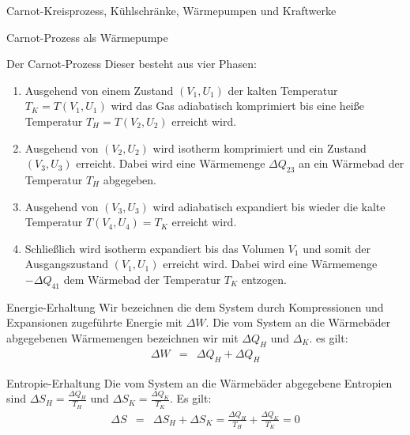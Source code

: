 \begin{chapter}{\titlestr}
\begin{section}{Carnot-Kreisprozess, Kühlschränke, Wärmepumpen und Kraftwerke}
\begin{subsection}{Carnot-Prozess als Wärmepumpe}
\begin{subsubsection}{Der Carnot-Prozess}
Dieser besteht aus vier Phasen:
\begin{enumerate}
	\item Ausgehend von einem Zustand $(V_1,U_1)$ der kalten Temperatur $T_K=T(V_1,U_1)$ wird das Gas adiabatisch komprimiert bis eine heiße Temperatur $T_H=T(V_2,U_2)$ erreicht wird.
	\item Ausgehend von $(V_2,U_2)$ wird isotherm komprimiert und ein Zustand $(V_3, U_3)$ erreicht. Dabei wird eine Wärmemenge $\Delta Q_{23}$ an ein Wärmebad der Temperatur $T_H$ abgegeben.
	\item Ausgehend von $(V_3,U_3)$ wird adiabatisch expandiert bis wieder die kalte Temperatur $T(V_4,U_4)=T_K$ erreicht wird.
	\item Schließlich wird  isotherm expandiert bis das Volumen $V_1$ und somit der Ausgangszustand $(V_1,U_1)$ erreicht wird. Dabei wird eine Wärmemenge $-\Delta Q_{41}$ dem Wärmebad der Temperatur $T_K$ entzogen.
\end{enumerate}
\end{subsubsection}

\begin{subsubsection}{Energie-Erhaltung}
Wir bezeichnen die dem System durch Kompressionen und Expansionen zugeführte Energie mit $\Delta W$. Die vom System an die Wärmebäder abgegebenen Wärmemengen
bezeichnen wir mit $\Delta Q_H$ und $\Delta_K$. es gilt:
\begin{eqnarray*}
\Delta W &=& \Delta Q_H+\Delta Q_H
\end{eqnarray*}
\end{subsubsection}

\begin{subsubsection}{Entropie-Erhaltung}
Die vom System an die Wärmebäder abgegebene Entropien sind $\Delta S_H=\frac{\Delta Q_H}{T_H}$ und $\Delta S_K=\frac{\Delta Q_K}{T_K}$. Es gilt:
\begin{eqnarray*}
\Delta S &=& \Delta S_H+\Delta S_K = \frac{\Delta Q_H}{T_H}+\frac{\Delta Q_K}{T_K} = 0
\end{eqnarray*}
\end{subsubsection}


\end{subsection}
\end{section}
\end{chapter}
